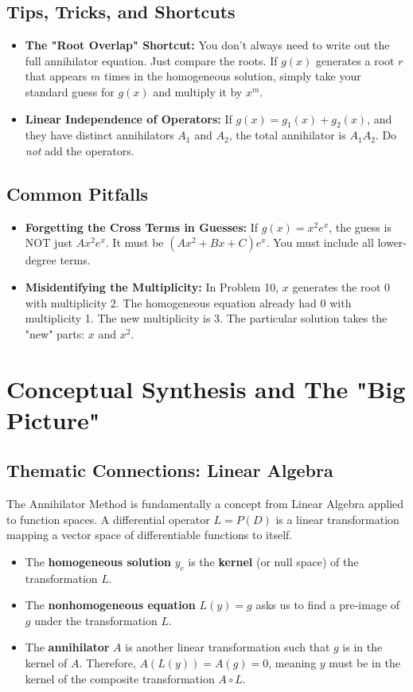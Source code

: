 \documentclass[11pt, a4paper]{article}
\theoremstyle{definition}
\theoremstyle{remark}
\begin{document}
\subsection{Tips, Tricks, and Shortcuts}
\begin{itemize}
    \item \textbf{The "Root Overlap" Shortcut:} You don't always need to write out the full annihilator equation. Just compare the roots. If $g(x)$ generates a root $r$ that appears $m$ times in the homogeneous solution, simply take your standard guess for $g(x)$ and multiply it by $x^m$.
    \item \textbf{Linear Independence of Operators:} If $g(x) = g_1(x) + g_2(x)$, and they have distinct annihilators $A_1$ and $A_2$, the total annihilator is $A_1 A_2$. Do \textit{not} add the operators.
\end{itemize}

\subsection{Common Pitfalls}
\begin{itemize}
    \item \textbf{Forgetting the Cross Terms in Guesses:} If $g(x) = x^2 e^x$, the guess is NOT just $A x^2 e^x$. It must be $(Ax^2 + Bx + C)e^x$. You must include all lower-degree terms.
    \item \textbf{Misidentifying the Multiplicity:} In Problem 10, $x$ generates the root $0$ with multiplicity 2. The homogeneous equation already had $0$ with multiplicity 1. The new multiplicity is 3. The particular solution takes the "new" parts: $x$ and $x^2$.
\end{itemize}

\newpage
\section{Conceptual Synthesis and The "Big Picture"}

\subsection{Thematic Connections: Linear Algebra}
The Annihilator Method is fundamentally a concept from Linear Algebra applied to function spaces. A differential operator $L = P(D)$ is a linear transformation mapping a vector space of differentiable functions to itself. 
\begin{itemize}
    \item The \textbf{homogeneous solution} $y_c$ is the \textbf{kernel} (or null space) of the transformation $L$.
    \item The \textbf{nonhomogeneous equation} $L(y) = g$ asks us to find a pre-image of $g$ under the transformation $L$.
    \item The \textbf{annihilator} $A$ is another linear transformation such that $g$ is in the kernel of $A$. Therefore, $A(L(y)) = A(g) = 0$, meaning $y$ must be in the kernel of the composite transformation $A \circ L$.
\end{itemize}
\end{document}
